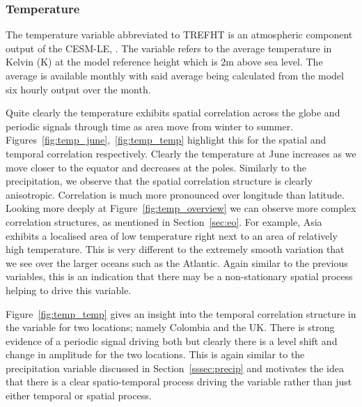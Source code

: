 \subsubsection{Temperature \label{sssec:temp}}
The temperature variable abbreviated to TREFHT is an atmospheric component output of the CESM-LE, \citep{kay_community_2015}.
The variable refers to the average temperature in Kelvin ($\si{\kelvin}$) at the model reference height which is $2\si{\meter}$ above sea level.
The average is available monthly with said average being calculated from the model six hourly output over the month.

Quite clearly the temperature exhibits spatial correlation across the globe and periodic signals through time as area move from winter to summer.
Figures~\ref{fig:temp_june},~\ref{fig:temp_temp} highlight this for the spatial and temporal correlation respectively.
Clearly the temperature at June increases as we move closer to the equator and decreases at the poles. 
Similarly to the precipitation, we observe that the spatial correlation structure is clearly anisotropic. 
Correlation is much more pronounced over longitude than latitude. 
Looking more deeply at Figure~\ref{fig:temp_overview} we can observe more complex correlation structures, as mentioned in Section~\ref{sec:eo}. 
For example, Asia exhibits a localised area of low temperature right next to an area of relatively high temperature. 
This is very different to the extremely smooth variation that we see over the larger oceans such as the Atlantic. 
Again similar to the previous variables, this is an indication that there may be a non-stationary spatial process helping to drive this variable.

Figure~\ref{fig:temp_temp} gives an insight into the temporal correlation structure in the variable for two locations; namely Colombia and the UK. 
There is strong evidence of a periodic signal driving both but clearly there is a level shift and change in amplitude for the two locations. 
This is again similar to the precipitation variable discussed in Section~\ref{sssec:precip} and motivates the idea that there is a clear spatio-temporal process driving the variable rather than just either temporal or spatial process.

